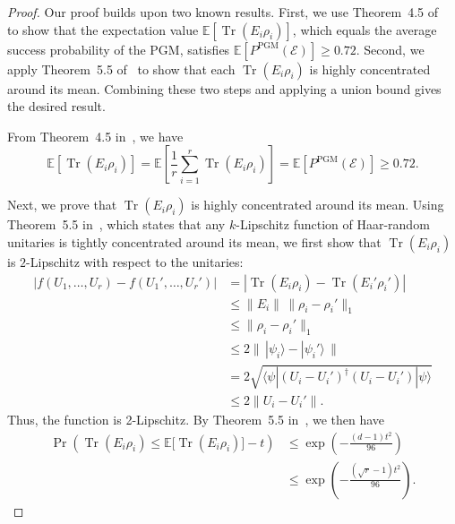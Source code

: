 \documentclass[12pt]{article}
\begin{document}
\begin{proof}
Our proof builds upon two known results. First, we use Theorem~4.5 of~\cite{montanaro2007distinguishability} to show that the expectation value $\mathbb{E}[\operatorname{Tr}(E_i\rho_i)]$, which equals the average success probability of the PGM, satisfies $\mathbb{E}[P^{\mathrm{PGM}}(\mathcal{E})] \ge 0.72$. Second, we apply Theorem~5.5 of~\cite{nayak2023rigidity} to show that each $\operatorname{Tr}(E_i\rho_i)$ is highly concentrated around its mean. Combining these two steps and applying a union bound gives the desired result.

From Theorem~4.5 in~\cite{montanaro2007distinguishability}, we have
\begin{equation}
    \mathbb{E}[\operatorname{Tr}(E_i\rho_i)] 
    = \mathbb{E}\!\left[\frac{1}{r}\sum_{i=1}^r \operatorname{Tr}(E_i\rho_i)\right]
    = \mathbb{E}[P^{\mathrm{PGM}}(\mathcal{E})] 
    \ge 0.72.
\end{equation}

Next, we prove that $\operatorname{Tr}(E_i\rho_i)$ is highly concentrated around its mean. 
Using Theorem~5.5 in~\cite{nayak2023rigidity}, which states that any $k$-Lipschitz function of Haar-random unitaries is tightly concentrated around its mean, we first show that $\operatorname{Tr}(E_i\rho_i)$ is $2$-Lipschitz with respect to the unitaries:
\begin{equation}
\begin{split}
    |f(U_1,\dots,U_r) - f(U_1',\dots,U_r')| 
    &= |\operatorname{Tr}(E_i\rho_i) - \operatorname{Tr}(E_i'\rho_i')| \\
    &\leq \|E_i\|\, \|\rho_i - \rho_i'\|_1 \\
    &\leq \|\rho_i - \rho_i'\|_1 \\
    &\leq 2 \|\,|\psi_i\rangle - |\psi_i'\rangle\,\| \\
    &= 2\sqrt{\langle \psi | (U_i - U_i')^\dagger (U_i - U_i') | \psi \rangle} \\
    &\leq 2\|U_i - U_i'\|.
\end{split}
\end{equation}
Thus, the function is 2-Lipschitz. 
By Theorem~5.5 in~\cite{nayak2023rigidity}, we then have
\begin{equation}
\begin{split}
    \Pr\!\left( \operatorname{Tr}(E_i \rho_i) 
    \le \mathbb{E}\bigl[\operatorname{Tr}(E_i \rho_i)\bigr] - t \right)
    &\le \exp\!\left( -\frac{(d - 1)t^2}{96} \right) \\
    &\le \exp\!\left( -\frac{(\sqrt{r} - 1)t^2}{96} \right).
\end{split}
\end{equation}


\end{proof}
\end{document}
